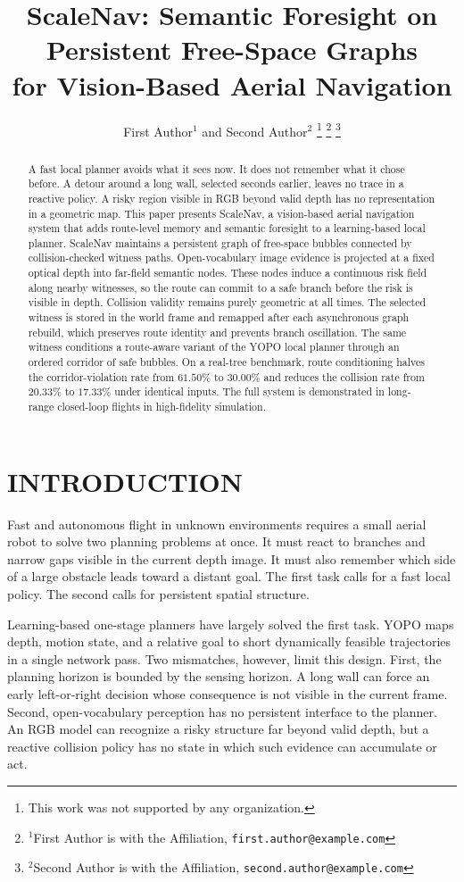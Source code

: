 \documentclass[letterpaper,10pt,conference]{ieeeconf}
\title{\LARGE \bf
ScaleNav: Semantic Foresight on Persistent Free-Space Graphs\\
for Vision-Based Aerial Navigation
}
\author{First Author$^{1}$ and Second Author$^{2}$%
\thanks{This work was not supported by any organization.}%
\thanks{$^{1}$First Author is with the Affiliation,
        {\tt\small first.author@example.com}}%
\thanks{$^{2}$Second Author is with the Affiliation,
        {\tt\small second.author@example.com}}%
}
\begin{document}
\maketitle
\thispagestyle{empty}
\pagestyle{empty}

\begin{abstract}
A fast local planner avoids what it sees now. It does not remember what it
chose before. A detour around a long wall, selected seconds earlier, leaves
no trace in a reactive policy. A risky region visible in RGB beyond valid
depth has no representation in a geometric map. This paper presents ScaleNav,
a vision-based aerial navigation system that adds route-level memory and
semantic foresight to a learning-based local planner. ScaleNav maintains a
persistent graph of free-space bubbles connected by collision-checked witness
paths. Open-vocabulary image evidence is projected at a fixed optical depth
into far-field semantic nodes. These nodes induce a continuous risk field
along nearby witnesses, so the route can commit to a safe branch before the
risk is visible in depth. Collision validity remains purely geometric at all
times. The selected witness is stored in the world frame and remapped after
each asynchronous graph rebuild, which preserves route identity and prevents
branch oscillation. The same witness conditions a route-aware variant of the
YOPO local planner through an ordered corridor of safe bubbles. On a
real-tree benchmark, route conditioning halves the corridor-violation rate
from $61.50\%$ to $30.00\%$ and reduces the collision rate from $20.33\%$ to
$17.33\%$ under identical inputs. The full system is demonstrated in
long-range closed-loop flights in high-fidelity simulation.
\end{abstract}

\section{INTRODUCTION}
Fast and autonomous flight in unknown environments requires a small aerial
robot to solve two planning problems at once. It must react to branches and
narrow gaps visible in the current depth image. It must also remember which
side of a large obstacle leads toward a distant goal. The first task calls
for a fast local policy. The second calls for persistent spatial structure.

Learning-based one-stage planners have largely solved the first task.
YOPO \cite{yopo} maps depth, motion state, and a relative goal to short
dynamically feasible trajectories in a single network pass. Two mismatches,
however, limit this design. First, the planning horizon is bounded by the
sensing horizon. A long wall can force an early left-or-right decision whose
consequence is not visible in the current frame. Second, open-vocabulary
perception has no persistent interface to the planner. An RGB model can
recognize a risky structure far beyond valid depth, but a reactive collision
policy has no state in which such evidence can accumulate or act.
\end{document}
